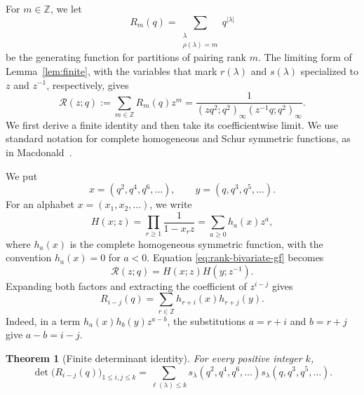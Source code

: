 \documentclass[11pt]{article}
\newtheorem{theorem}{Theorem}[section]
\theoremstyle{definition}
\theoremstyle{remark}
\begin{document}
For $m\in\mathbb Z$, we let
\[
 R_m(q)=\sum_{\substack{\lambda\\\rho(\lambda)=m}}q^{|\lambda|}
\]
be the generating function for partitions of pairing rank $m$.  The limiting
form of Lemma~\ref{lem:finite}, with the variables that mark $r(\lambda)$ and
$s(\lambda)$ specialized to $z$ and $z^{-1}$, respectively, gives
\begin{equation}\label{eq:rank-bivariate-gf}
 \mathcal R(z;q)
 :=\sum_{m\in\mathbb Z}R_m(q)z^m
 =\frac{1}{(zq^2;q^2)_\infty(z^{-1}q;q^2)_\infty}.
\end{equation}
We first derive a finite identity and then take its coefficientwise limit.  We use standard notation for complete homogeneous and Schur symmetric functions, as in Macdonald~\cite[Chapter~I]{Macdonald1995}.

We put
\[
 x=(q^2,q^4,q^6,\ldots),
 \qquad
 y=(q,q^3,q^5,\ldots).
\]
For an alphabet $x=(x_1,x_2,\ldots)$, we write
\[
 H(x;z)=\prod_{r\geq1}\frac{1}{1-x_rz}
       =\sum_{a\geq0}h_a(x)z^a,
\]
where $h_a(x)$ is the complete homogeneous symmetric function, with the
convention $h_a(x)=0$ for $a<0$.  Equation
\eqref{eq:rank-bivariate-gf} becomes
\begin{equation}\label{eq:rank-H-factorization}
 \mathcal R(z;q)=H(x;z)H(y;z^{-1}).
\end{equation}
Expanding both factors and extracting the coefficient of $z^{i-j}$ gives
\begin{equation}\label{eq:rank-convolution}
 R_{i-j}(q)
 =\sum_{r\in\mathbb Z}h_{r+i}(x)h_{r+j}(y).
\end{equation}
Indeed, in a term $h_a(x)h_b(y)z^{a-b}$, the substitutions
$a=r+i$ and $b=r+j$ give $a-b=i-j$.

\begin{theorem}[Finite determinant identity]\label{thm:finite-rank-determinant}
For every positive integer $k$,
\begin{equation}\label{eq:finite-rank-determinant}
 \det\bigl(R_{i-j}(q)\bigr)_{1\leq i,j\leq k}
 =\sum_{\ell(\lambda)\leq k}
 s_\lambda(q^2,q^4,q^6,\ldots)
 s_\lambda(q,q^3,q^5,\ldots).
\end{equation}
\end{theorem}
\end{document}
